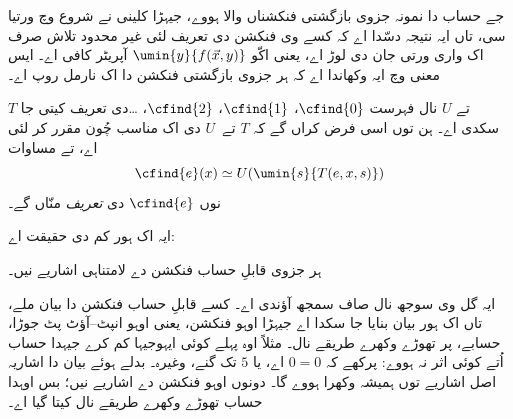 \documentclass[../../../include/open-logic-section]{subfiles}
\begin{document}
جے حساب دا نمونہ جزوی بازگشتی فنکشناں والا ہووے، جیہڑا
کلینی نے شروع وچ ورتیا سی، تاں ایہ نتیجہ دسّدا اے کہ
کسے وی فنکشن دی تعریف لئی غیر محدود تلاش صرف اک واری
ورتی جان دی لوڑ اے، یعنی اکّو $\umin{y}{f(\vec x, y)}$
آپریٹر کافی اے۔ ایس معنی وچ ایہ وکھاندا اے کہ ہر جزوی
بازگشتی فنکشن دا اک نارمل روپ اے۔

$T$ تے $U$ نال فہرست $\cfind{0}$، $\cfind{1}$، $\cfind{2}$،
\dots دی تعریف کیتی جا سکدی اے۔ ہن توں اسی فرض کراں گے
کہ $T$ تے~$U$ دی اک مناسب چُون مقرر کر لئی اے، تے مساوات
\[
\cfind{e}(x) \simeq U(\umin{s}{T(e,x,s)})
\]
نوں $\cfind{e}$ دی \emph{تعریف} منّاں گے۔

ایہ اک ہور کم دی حقیقت اے:

\begin{thm}
ہر جزوی قابلِ حساب فنکشن دے لامتناہی اشاریے نیں۔
\end{thm}

ایہ گل وی سوجھ نال صاف سمجھ آؤندی اے۔ کسے قابلِ حساب
فنکشن دا بیان ملے، تاں اک ہور بیان بنایا جا سکدا اے
جیہڑا اوہو فنکشن، یعنی اوہو انپٹ--آؤٹ پٹ جوڑا، حسابے،
پر تھوڑے وکھرے طریقے نال۔ مثلاً اوہ پہلے کوئی ایہوجیہا
کم کرے جیہدا حساب اُتے کوئی اثر نہ ہووے: پرکھے کہ
$0 = 0$ اے، یا $5$ تک گنے، وغیرہ۔ بدلے ہوئے بیان دا
اشاریہ اصل اشاریے توں ہمیشہ وکھرا ہووے گا۔ دونوں اوہو
فنکشن دے اشاریے نیں؛ بس اوہدا حساب تھوڑے وکھرے طریقے
نال کیتا گیا اے۔
\end{document}
